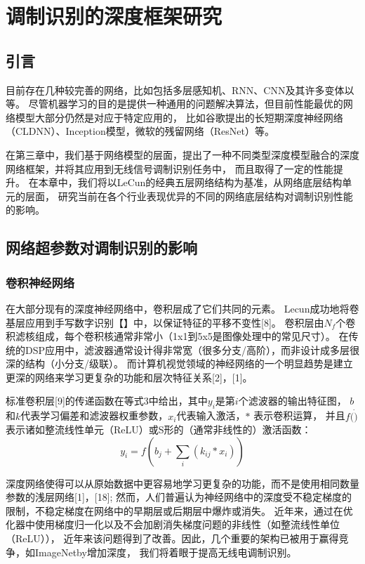 \chapter{调制识别的深度框架研究}

\section{引言}

目前存在几种较完善的网络，比如包括多层感知机、RNN、CNN及其许多变体以等。
尽管机器学习的目的是提供一种通用的问题解决算法，但目前性能最优的网络模型大部分仍然是对应于特定应用的，
比如谷歌提出的长短期深度神经网络（CLDNN）、Inception模型，微软的残留网络（ResNet）等。 \par

在第三章中，我们基于网络模型的层面，提出了一种不同类型深度模型融合的深度网络框架，并将其应用到无线信号调制识别任务中，
而且取得了一定的性能提升。
在本章中，我们将以LeCun的经典五层网络结构为基准，从网络底层结构单元的层面，
研究当前在各个行业表现优异的不同的网络底层结构对调制识别性能的影响。

\section{网络超参数对调制识别的影响}

\subsection{卷积神经网络}

在大部分现有的深度神经网络中，卷积层成了它们共同的元素。
Lecun成功地将卷基层应用到手写数字识别【】中，以保证特征的平移不变性[8]。
卷积层由$N_f$个卷积滤核组成，每个卷积核通常非常小（1x1到5x5是图像处理中的常见尺寸）。
在传统的DSP应用中，滤波器通常设计得非常宽（很多分支/高阶），而非设计成多层很深的结构（小分支/级联）。
而计算机视觉领域的神经网络的一个明显趋势是建立更深的网络来学习更复杂的功能和层次特征关系[2]，[1]。\par

标准卷积层[9]的传递函数在等式3中给出，其中$y_i$是第$i$个滤波器的输出特征图，
$b$和$k$代表学习偏差和滤波器权重参数，$x_i$代表输入激活，$*$ 表示卷积运算，
并且$f(\dot)$表示诸如整流线性单元（ReLU）或S形的（通常非线性的）激活函数：
\begin{equation}
	y_i = f (b_j + \sum_{i}(k_{ij} * x_i))
\end{equation}


深度网络使得可以从原始数据中更容易地学习更复杂的功能，而不是使用相同数量参数的浅层网络[1]，[18];
然而，人们普遍认为神经网络中的深度受不稳定梯度的限制，不稳定梯度在网络中的早期层或后期层中爆炸或消失。
近年来，通过在优化器中使用梯度归一化以及不会加剧消失梯度问题的非线性（如整流线性单位（ReLU）），
近年来该问题得到了改善。因此，几个重要的架构已被用于赢得竞争，如ImageNetby增加深度，
我们将着眼于提高无线电调制识别。\par


